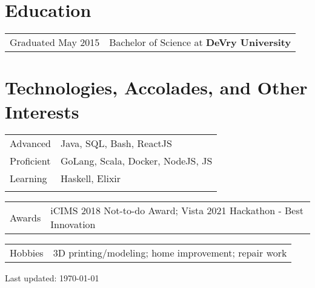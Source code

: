 \documentclass[a4paper,11pt]{article}
\begin{document}
\section{Education}
\begin{tabularx}{\linewidth}{@{}l X@{}}	
Graduated May 2015 & Bachelor of Science at \textbf{DeVry University} \hfill \normalsize \\

\end{tabularx}

\section{Technologies, Accolades, and Other Interests}
\begin{tabularx}{\linewidth}{@{}l X@{}}
Advanced &  \normalsize{Java, SQL, Bash, ReactJS}\\
Proficient  &  \normalsize{GoLang, Scala, Docker, NodeJS, JS}\\
Learning & \normalsize{Haskell, Elixir}\\
\newline
\end{tabularx}
\begin{tabularx}{\linewidth}{@{}l X@{}}
Awards &  \normalsize{iCIMS 2018 Not-to-do Award; Vista 2021 Hackathon - Best Innovation}\\ 
\end{tabularx}
\begin{tabularx}{\linewidth}{@{}l X@{}}
Hobbies &  \normalsize{3D printing/modeling; home improvement; repair work}\\ 
\end{tabularx}

\vfill
{\footnotesize Last updated: \today}
\end{document}
